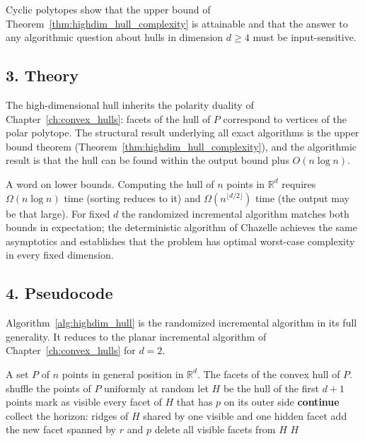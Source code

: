Cyclic polytopes show that the upper bound of
Theorem~\ref{thm:highdim_hull_complexity} is attainable and that the answer to
any algorithmic question about hulls in dimension $d \ge 4$ must be
input-sensitive.

\subsection{3. Theory}

The high-dimensional hull inherits the polarity duality of
Chapter~\ref{ch:convex_hulls}: facets of the hull of $P$ correspond to
vertices of the polar polytope. The structural result underlying all exact
algorithms is the upper bound theorem
(Theorem~\ref{thm:highdim_hull_complexity}), and the algorithmic result is
that the hull can be found within the output bound plus $O(n \log n)$.

A word on lower bounds. Computing the hull of $n$ points in $\mathbb{R}^d$
requires $\Omega(n \log n)$ time (sorting reduces to it) and
$\Omega(n^{\lfloor d/2 \rfloor})$ time (the output may be that large). For
fixed $d$ the randomized incremental algorithm matches both bounds in
expectation; the deterministic algorithm of Chazelle achieves the same
asymptotics and establishes that the problem has optimal worst-case
complexity in every fixed dimension.

\subsection{4. Pseudocode}

Algorithm~\ref{alg:highdim_hull} is the randomized incremental algorithm in
its full generality. It reduces to the planar incremental algorithm of
Chapter~\ref{ch:convex_hulls} for $d = 2$.

\begin{algorithm}[htbp]
\caption{Randomized Incremental Convex Hull in $\mathbb{R}^d$}
\label{alg:highdim_hull}
\begin{algorithmic}[1]
\Require A set $P$ of $n$ points in general position in $\mathbb{R}^d$.
\Ensure The facets of the convex hull of $P$.
  \State shuffle the points of $P$ uniformly at random
  \State let $H$ be the hull of the first $d+1$ points
    \State mark as visible every facet of $H$ that has $p$ on its outer side
      \State \textbf{continue} 
    \EndIf
    \State collect the horizon: ridges of $H$ shared by one visible and one hidden facet
      \State add the new facet spanned by $r$ and $p$
    \EndFor
    \State delete all visible facets from $H$
  \EndFor
  \State \Return $H$
\EndFunction
\end{algorithmic}
\end{algorithm}

